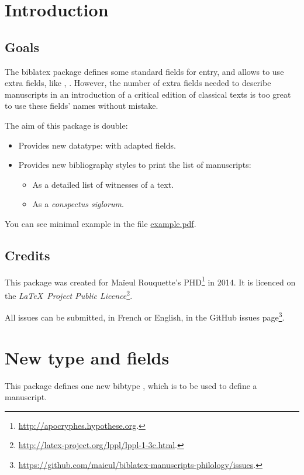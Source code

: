 \documentclass{ltxdockit}[2011/03/25]
\newcommand{\biblatex}{biblatex\xspace}
\begin{document}
\printtitlepage
\tableofcontents
\section{Introduction}
\subsection{Goals}
The \biblatex package defines some standard fields for entry, and allows to use extra fields, like , . However, the number of extra fields needed to describe manuscripts in an introduction of a critical edition of classical texts is too great to use these fields' names without mistake.

The aim of this package is double:

\begin{itemize}
\item Provides new datatype:  with adapted fields.
\item Provides new bibliography styles to print the list of manuscripts:
\begin{itemize}
	\item As a detailed list of witnesses of a text.
	\item As a \emph{conspectus siglorum}.
\end{itemize}
\end{itemize}

You can see minimal example in the file \href{file:example.pdf}{example.pdf}.
\subsection{Credits}

This package was created for Maïeul Rouquette's PHD\footnote{\url{http://apocryphes.hypothese.org}.} in 2014. It is licenced on the \emph{\LaTeX\ Project Public Licence}\footnote{\url{http://latex-project.org/lppl/lppl-1-3c.html}.}.

All issues can be submitted, in French or English, in the GitHub issues page\footnote{\url{https://github.com/maieul/biblatex-manuscripts-philology/issues}.}.


\section{New type and fields}

This package defines one new bibtype , which is to be used to define a manuscript.
\end{document}
